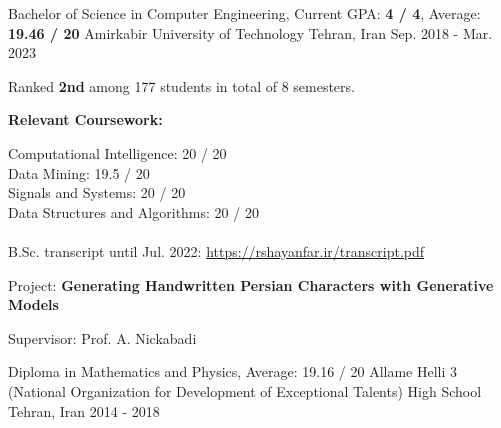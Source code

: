 

\begin{cventries}

  \cventry
    {Bachelor of Science in Computer Engineering, Current GPA: \textbf{4 / 4}, Average: \textbf{19.46 / 20}} %
    {Amirkabir University of Technology} %
    {Tehran, Iran} %
    {Sep. 2018 - Mar. 2023} %
    {
      \begin{cvitems}
        \item{Ranked \textbf{2nd} among 177 students in total of 8 semesters.}
        \item{
          \textbf{Relevant Coursework:}
          \smallskip
          \begin{adjustwidth}{4mm}{}
            Computational Intelligence: 20 / 20 \\
	          Data Mining: 19.5 / 20 \\
          	Signals and Systems: 20 / 20 \\
          	Data Structures and Algorithms: 20 / 20 \\
            \\[-2mm]
          	\textcolor{awesome-skyblue}{B.Sc. transcript until Jul. 2022: \href{https://rshayanfar.ir/transcript.pdf}{https://rshayanfar.ir/transcript.pdf}}
          	\medskip
          \end{adjustwidth}
        }
        \item{
          Project: \textbf{Generating Handwritten Persian Characters with Generative Models}
        }
        \item{
          Supervisor: Prof. A. Nickabadi
        }
      \end{cvitems}
    }

  \cventry
    {Diploma in Mathematics and Physics, Average: 19.16 / 20} %
    {{\fontsize{9.8pt}{1em}\bodyfont Allame Helli 3 (National Organization for Development of Exceptional Talents) High School}}
    {Tehran, Iran} %
    {2014 - 2018} %
    {} \vspace*{-5mm}

\end{cventries}

